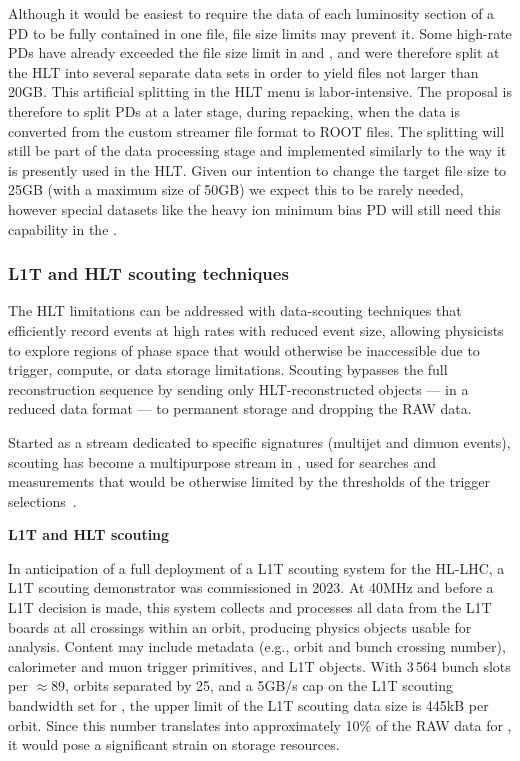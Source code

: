 Although it would be easiest to require the data of each luminosity section of a \gls{PD} to be fully contained in one file, file size limits may prevent it.
Some high-rate PDs have already exceeded the \PhaseOne file size limit in \RunTwo and \RunThree, and were therefore split at the \gls{HLT} into several separate data sets in order to yield files not larger than 20\unit{GB}. This artificial splitting in the \gls{HLT} menu is labor-intensive. The proposal is therefore to split PDs at a later stage, during repacking, when the data is converted from the custom streamer file format to \textsc{ROOT} files. The splitting will still be part of the \TierZero data processing stage and implemented similarly to the way it is presently used in the \gls{HLT}. Given our intention to change the target file size to 25\unit{GB} (with a maximum size of 50\unit{GB}) we expect this to be rarely needed, however special datasets like the heavy ion minimum bias PD will still need this capability in the \TierZero.

\subsubsection{L1T and HLT scouting techniques}

The \gls{HLT} limitations can be addressed with data-scouting techniques that efficiently record events at high rates with reduced event size, allowing physicists to explore regions of phase space that would otherwise be inaccessible due to trigger, compute, or data storage limitations. Scouting bypasses the full reconstruction sequence by sending only HLT-reconstructed objects --- in a reduced data format --- to permanent storage and dropping the \gls{RAW} data.

Started as a stream dedicated to specific signatures (multijet and dimuon events), scouting has become a multipurpose stream in \RunThree, used for searches and measurements that would be otherwise limited by the thresholds of the trigger selections~\cite{CMS:2019buh,CMS:2018mgb,CMS:2018ikp,CMS:2019mcu,CMS:2021sch,CMS:2023thf}.

\textbf{L1T and HLT scouting}
\label{sec:scouting}

In anticipation of a full deployment of a \gls{L1T} scouting system for the \gls{HL-LHC}, a \gls{L1T} scouting demonstrator was commissioned in 2023. At 40\unit{MHz} and before a \gls{L1T} decision is made, this system collects and processes all data from the \gls{L1T} boards at all crossings within an orbit, producing physics objects usable for analysis.
Content may include metadata (e.g., orbit and bunch crossing number), calorimeter and muon trigger primitives, and \gls{L1T} objects.
With 3\,564 bunch slots per $\approx$89\mus, orbits separated by 25\ns, and a 5\unit{GB/s} cap on the \gls{L1T} scouting bandwidth set for \RunFour, the upper limit of the \gls{L1T} scouting data size is 445\unit{kB} per orbit. Since this number translates into approximately 10\% of the \gls{RAW} data for \RunFour, it would pose a significant strain on storage resources.

